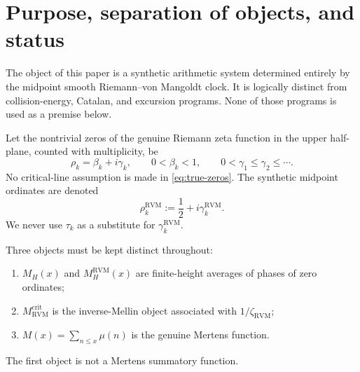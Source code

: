 \documentclass[11pt,reqno]{amsart}
\theoremstyle{definition}
\theoremstyle{remark}
\newcommand{\RVM}{\mathrm{RVM}}
\newcommand{\crit}{\mathrm{crit}}
\begin{document}
\section{Purpose, separation of objects, and status}

The object of this paper is a synthetic arithmetic system determined entirely by the midpoint smooth Riemann--von Mangoldt clock.  It is logically distinct from collision-energy, Catalan, and excursion programs.  None of those programs is used as a premise below.

Let the nontrivial zeros of the genuine Riemann zeta function in the upper half-plane, counted with multiplicity, be
\begin{equation}\label{eq:true-zeros}
 \rho_k=\beta_k+i\gamma_k,
 \qquad 0<\beta_k<1,
 \qquad 0<\gamma_1\le\gamma_2\le\cdots .
\end{equation}
No critical-line assumption is made in \eqref{eq:true-zeros}.  The synthetic midpoint ordinates are denoted
\begin{equation}\label{eq:synthetic-zero-notation}
 \rho_k^{\RVM}:=\frac12+i\gamma_k^{\RVM}.
\end{equation}
We never use $\tau_k$ as a substitute for $\gamma_k^{\RVM}$.

Three objects must be kept distinct throughout:
\begin{enumerate}[label=\textup{(\roman*)}]
\item $M_H(x)$ and $M_H^{\RVM}(x)$ are finite-height averages of phases of zero ordinates;
\item $M_{\RVM}^{\crit}$ is the inverse-Mellin object associated with $1/\zeta_{\RVM}$;
\item $M(x)=\sum_{n\le x}\mu(n)$ is the genuine Mertens function.
\end{enumerate}
The first object is not a Mertens summatory function.
\end{document}
